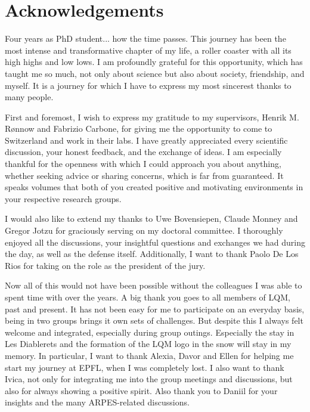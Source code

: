 \chapter*{Acknowledgements}
Four years as PhD student... how the time passes.
This journey has been the most intense and transformative chapter of my life, a roller coaster with all its high highs and low lows.
I am profoundly grateful for this opportunity, which has taught me so much, not only about science but also about society, friendship, and myself.
It is a journey for which I have to express my most sincerest thanks to many people.\hfill\break

First and foremost, I wish to express my gratitude to my supervisors, Henrik M. R{\o}nnow and Fabrizio Carbone, for giving me the opportunity to come to Switzerland and work in their labs.
I have greatly appreciated every scientific discussion, your honest feedback, and the exchange of ideas.
I am especially thankful for the openness with which I could approach you about anything, whether seeking advice or sharing concerns, which is far from guaranteed.
It speaks volumes that both of you created positive and motivating environments in your respective research groups.\hfill\break

I would also like to extend my thanks to Uwe Bovensiepen, Claude Monney and Gregor Jotzu for graciously serving on my doctoral committee.
I thoroughly enjoyed all the discussions, your insightful questions and exchanges we had during the day, as well as the defense itself.
Additionally, I want to thank Paolo De Los Rios for taking on the role as the president of the jury.\hfill\break

Now all of this would not have been possible without the colleagues I was able to spent time with over the years.
A big thank you goes to all members of LQM, past and present.
It has not been easy for me to participate on an everyday basis, being in two groups brings it own sets of challenges.
But despite this I always felt welcome and integrated, especially during group outings.
Especially the stay in Les Diablerets and the formation of the LQM logo in the snow will stay in my memory.
In particular, I want to thank Alexia, Davor and Ellen for helping me start my journey at EPFL, when I was completely lost.
I also want to thank Ivica, not only for integrating me into the group meetings and discussions, but also for always showing a positive spirit.
Also thank you to Daniil for your insights and the many ARPES-related discussions.\hfill\break

